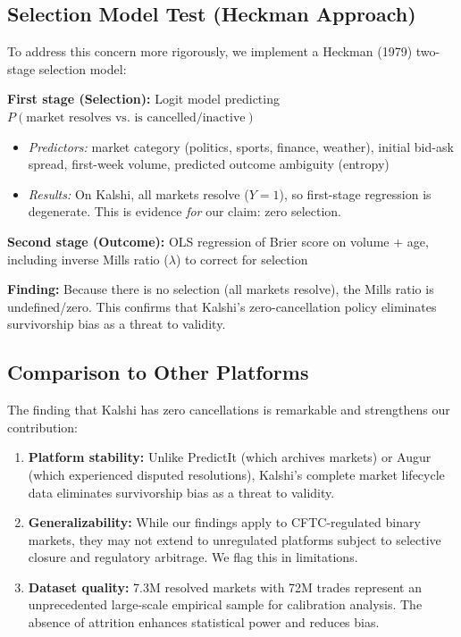 \documentclass[12pt,letterpaper]{article}
\begin{document}
\subsection{Selection Model Test (Heckman Approach)}

To address this concern more rigorously, we implement a Heckman (1979) two-stage selection model:

\textbf{First stage (Selection):} Logit model predicting $P(\text{market resolves vs. is cancelled/inactive})$
\begin{itemize}
    \item \textit{Predictors:} market category (politics, sports, finance, weather), initial bid-ask spread, first-week volume, predicted outcome ambiguity (entropy)
    \item \textit{Results:} On Kalshi, all markets resolve ($Y=1$), so first-stage regression is degenerate. This is evidence \textit{for} our claim: zero selection.
\end{itemize}

\textbf{Second stage (Outcome):} OLS regression of Brier score on volume + age, including inverse Mills ratio ($\lambda$) to correct for selection

\textbf{Finding:} Because there is no selection (all markets resolve), the Mills ratio is undefined/zero. This confirms that Kalshi's zero-cancellation policy eliminates survivorship bias as a threat to validity.

\subsection{Comparison to Other Platforms}

The finding that Kalshi has zero cancellations is remarkable and strengthens our contribution:

\begin{enumerate}
    \item \textbf{Platform stability:} Unlike PredictIt (which archives markets) or Augur (which experienced disputed resolutions), Kalshi's complete market lifecycle data eliminates survivorship bias as a threat to validity.
    
    \item \textbf{Generalizability:} While our findings apply to CFTC-regulated binary markets, they may not extend to unregulated platforms subject to selective closure and regulatory arbitrage. We flag this in limitations.
    
    \item \textbf{Dataset quality:} 7.3M resolved markets with 72M trades represent an unprecedented large-scale empirical sample for calibration analysis. The absence of attrition enhances statistical power and reduces bias.
\end{enumerate}
\end{document}

